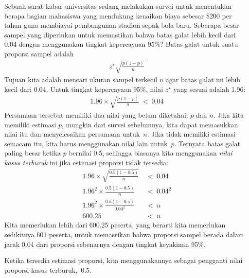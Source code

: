 \begin{examplewrap}
\begin{nexample}{Sebuah surat kabar universitas sedang melakukan
    survei untuk menentukan berapa bagian mahasiswa yang
    mendukung kenaikan biaya sebesar \$200 per tahun guna membiayai pembangunan
    stadion sepak bola baru.
    Seberapa besar sampel yang diperlukan untuk memastikan bahwa
    batas galat lebih kecil dari 0.04 dengan menggunakan
    tingkat kepercayaan 95\%?}
  Batas galat untuk suatu proporsi sampel adalah
  \begin{align*}
  z^{\star} \sqrt{\frac{p (1 - p)}{n}}
  \end{align*}
  Tujuan kita adalah mencari ukuran sampel terkecil $n$
  agar batas galat ini lebih kecil dari $0.04$.
  Untuk tingkat kepercayaan 95\%, nilai $z^{\star}$
  yang sesuai adalah 1.96:
  \begin{align*}
  1.96\times \sqrt{\frac{p(1-p)}{n}} \ < \ 0.04
  \end{align*}
  Persamaan tersebut memiliki dua nilai yang belum diketahui: $p$ dan $n$.
  Jika kita memiliki estimasi $p$, mungkin dari survei
  sebelumnya, kita dapat memasukkan nilai itu dan menyelesaikan persamaan untuk~$n$.
  Jika tidak memiliki estimasi semacam itu, kita harus menggunakan
  nilai lain untuk~$p$.
  Ternyata batas galat paling besar
  ketika $p$ bernilai 0.5, sehingga biasanya kita menggunakan
  \emph{nilai kasus terburuk} ini jika estimasi
  proporsi tidak tersedia:
  \begin{align*}
	1.96\times \sqrt{\frac{0.5(1-0.5)}{n}} &\ < \ 0.04 \\
	1.96^2\times \frac{0.5(1-0.5)}{n} &\ < \ 0.04^2 \\
	1.96^2\times \frac{0.5(1-0.5)}{0.04^2} &\ < \ n \\
	600.25 &\ < \  n
  \end{align*}
  Kita memerlukan lebih dari 600.25 peserta, yang berarti
  kita memerlukan sedikitnya 601 peserta, untuk memastikan bahwa
  proporsi sampel berada dalam jarak 0.04 dari proporsi sebenarnya
  dengan tingkat keyakinan 95\%.
\end{nexample}
\end{examplewrap}


Ketika tersedia estimasi proporsi, kita menggunakannya sebagai pengganti nilai proporsi kasus terburuk,~0.5.


